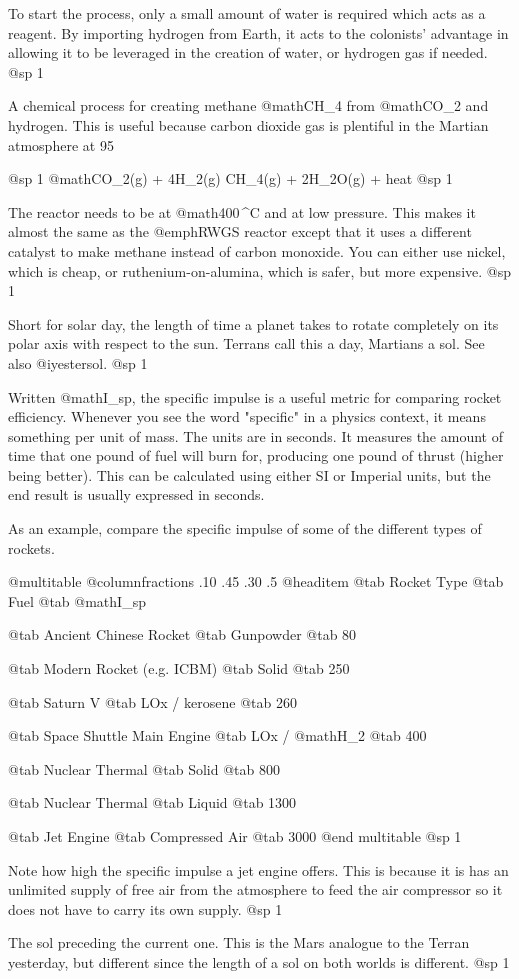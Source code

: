 To start the process, only a small amount of water is required which acts as a reagent. By importing hydrogen from Earth, it acts to the colonists' advantage in allowing it to be leveraged in the creation of water, or hydrogen gas if needed.
@sp 1

A chemical process for creating methane @math{CH_4} from @math{CO_2} and hydrogen. This is useful because carbon dioxide gas is plentiful in the Martian atmosphere at 95 %

@sp 1
@math{CO_2(g) + 4H_2(g) \rightarrow CH_4(g) + 2H_2O(g) + heat}
@sp 1

The reactor needs to be at @math{400\,^{\circ}{\rm C}} and at low pressure. This makes it almost the same as the @emph{RWGS reactor} except that it uses a different catalyst to make methane instead of carbon monoxide. You can either use nickel, which is cheap, or ruthenium-on-alumina, which is safer, but more expensive.
@sp 1

Short for solar day, the length of time a planet takes to rotate completely on its polar axis with respect to the sun. Terrans call this a day, Martians a sol. See also @i{yestersol}.
@sp 1

Written @math{I_{sp}}, the specific impulse is a useful metric for comparing rocket efficiency. Whenever you see the word "specific" in a physics context, it means something per unit of mass. The units are in seconds. It measures the amount of time that one pound of fuel will burn for, producing one pound of thrust (higher being better). This can be calculated using either SI or Imperial units, but the end result is usually expressed in seconds. 

As an example, compare the specific impulse of some of the different types of rockets.

@multitable @columnfractions .10 .45 .30 .5
@headitem @tab Rocket Type @tab Fuel @tab @math{I_{sp}}

\item
@tab Ancient Chinese Rocket
@tab Gunpowder
@tab 80
\item
@tab Modern Rocket (e.g. ICBM)
@tab Solid
@tab 250
\item
@tab Saturn V
@tab LOx / kerosene
@tab 260
\item
@tab Space Shuttle Main Engine
@tab LOx / @math{H_2}
@tab 400
\item
@tab Nuclear Thermal
@tab Solid
@tab 800
\item
@tab Nuclear Thermal 
@tab Liquid
@tab 1300
\item
@tab Jet Engine 
@tab Compressed Air
@tab 3000
@end multitable
@sp 1

Note how high the specific impulse a jet engine offers. This is because it is has an unlimited supply of free air from the atmosphere to feed the air compressor so it does not have to carry its own supply.
@sp 1

The sol preceding the current one. This is the Mars analogue to the Terran yesterday, but different since the length of a sol on both worlds is different.
@sp 1

